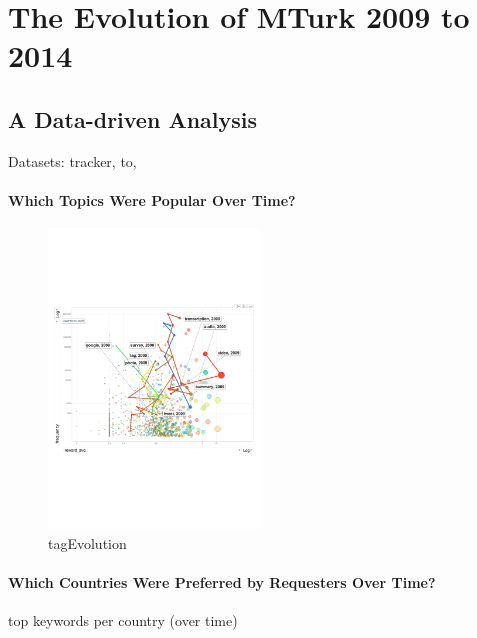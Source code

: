 \section{The Evolution of MTurk 2009 to 2014}
\label{sec:stats}
\subsection{A Data-driven Analysis}
Datasets: tracker, to, 
\paragraph{Which Topics Were Popular Over Time?}

\begin{figure}[htbp]
	\centering
		\includegraphics[width=0.5\textwidth]{figures/tagEvolution}
	\caption{tagEvolution}
	\label{fig:tagEvolution}
\end{figure}

\paragraph{Which Countries Were Preferred by Requesters Over Time?}
top keywords per country (over time)

